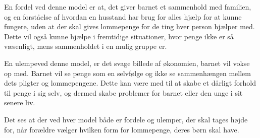 En fordel ved denne model er at, det giver 
barnet et sammenhold med familien, og en 
forståelse af hvordan en husstand har brug for 
alles hjælp for at kunne fungere, uden at der 
skal gives lommepenge for de ting hver person 
hjælper med. Dette vil også kunne hjælpe 
i fremtidige situationer, hvor penge 
ikke er så væsenligt, mens sammenholdet i en mulig 
gruppe er.

En ulempeved denne model, er det svage 
billede af økonomien, barnet vil vokse op med. 
Barnet vil se penge som en selvfølge og ikke se 
sammenhængen mellem dets pligter og 
lommepengene. Dette kan være med til at skabe et 
dårligt forhold til penge i sig selv, og dermed 
skabe problemer for barnet eller den unge i sit 
senere liv.

Det ses at der ved hver model både er fordele og ulemper, der skal tages højde for, når 
forældre vælger hvilken form for lommepenge, 
deres børn skal have.



